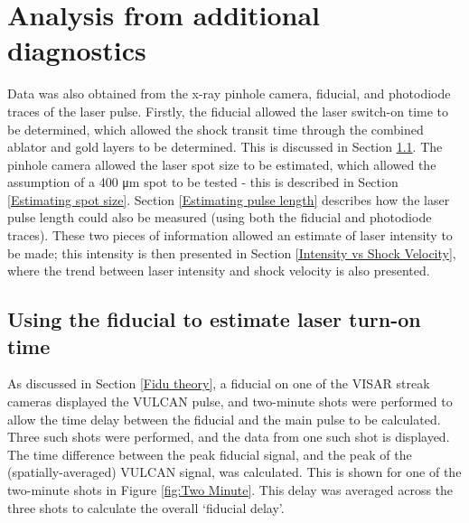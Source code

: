 \section{Analysis from additional diagnostics} \label{Other diagnostic analysis}

Data was also obtained from the x-ray pinhole camera, fiducial, and photodiode traces of the laser pulse. Firstly, the fiducial allowed the laser switch-on time to be determined, which allowed the shock transit time through the combined ablator and gold layers to be determined. This is discussed in Section \ref{Fidu for coating transit}. The pinhole camera allowed the laser spot size to be estimated, which allowed the assumption of a 400 \unit{\micro\meter} spot to be tested - this is described in Section \ref{Estimating spot size}. Section \ref{Estimating pulse length} describes how the laser pulse length could also be measured (using both the fiducial and photodiode traces). These two pieces of information allowed an estimate of laser intensity to be made; this intensity is then presented in Section \ref{Intensity vs Shock Velocity}, where the trend between laser intensity and shock velocity is also presented. 



\subsection{Using the fiducial to estimate laser turn-on time} \label{Fidu for coating transit}
As discussed in Section \ref{Fidu theory}, a fiducial on one of the VISAR streak cameras displayed the VULCAN pulse, and two-minute shots were performed to allow the time delay between the fiducial and the main pulse to be calculated. Three such shots were performed, and the data from one such shot is displayed. The time difference between the peak fiducial signal, and the peak of the (spatially-averaged) VULCAN signal, was calculated. This is shown for one of the two-minute shots in Figure \ref{fig:Two Minute}. This delay was averaged across the three shots to calculate the overall `fiducial delay'. 

